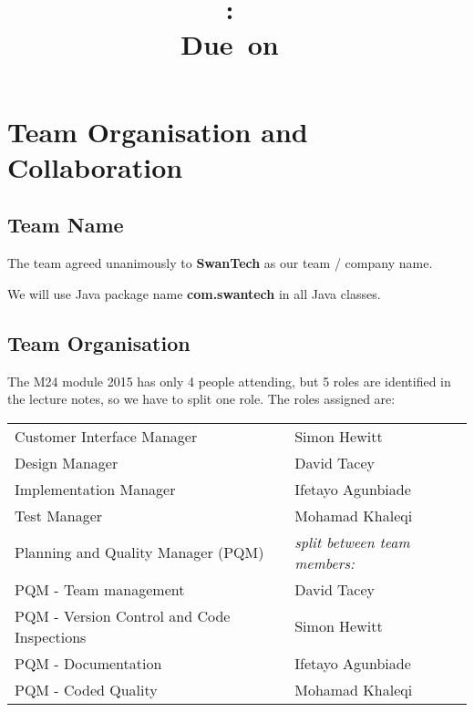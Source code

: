 \documentclass{article}
\title{
\vspace{2in}
\textmd{\textbf{\hmwkClass:\ \hmwkTitle}}\\
\normalsize\vspace{0.1in}\small{Due\ on\ \hmwkDueDate}\\
\vspace{0.1in}\large{\textit{\hmwkClassInstructor}}
\vspace{3in}
}
\author{\textbf{\hmwkAuthorName}}
\date{} %
\begin{document}
\maketitle



\newpage
\tableofcontents
\newpage
\section{Team Organisation and Collaboration}
\subsection{Team Name}
The team agreed unanimously to \textbf{SwanTech} as our team / company name.

We will use Java package name \textbf{com.swantech} in all Java classes.


\subsection{Team Organisation}
The M24 module 2015 has only 4 people attending, but 5 roles are identified in the lecture notes, so we have to split one role. The roles assigned are:\\

\begin{tabular}{ |l|l| }   %
 \hline
 Customer Interface Manager & Simon Hewitt  \\ 
 Design Manager & David Tacey  \\ 
 Implementation Manager & Ifetayo Agunbiade  \\ 
 Test Manager & Mohamad Khaleqi \\
 Planning and Quality Manager  (PQM)& \textit{split between team members:}\\
 PQM - Team management & David Tacey\\
 PQM - Version Control and Code Inspections & Simon Hewitt\\
 PQM - Documentation & Ifetayo Agunbiade\\
 PQM - Coded Quality & Mohamad Khaleqi \\
 \hline
\end{tabular}\\
\end{document}
